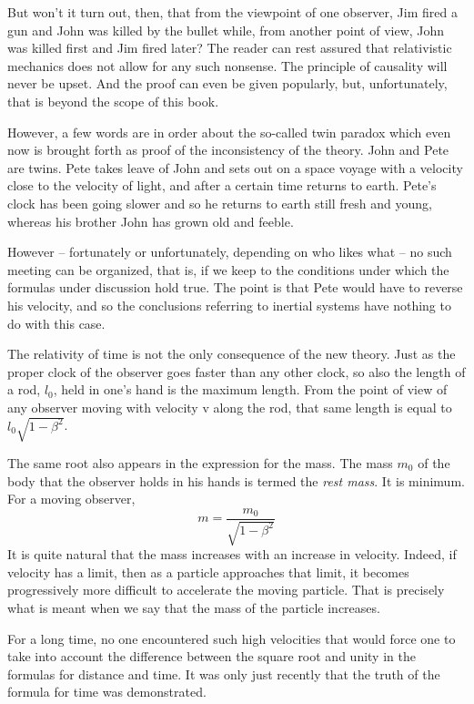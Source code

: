 But won't it turn out, then, that from the viewpoint of one observer, Jim fired a gun and John was killed by the bullet while, from another point of view, John was killed first and Jim fired later? The reader can rest assured that relativistic mechanics does not allow for any such nonsense. The principle of causality will never be upset. And the proof can even be given popularly, but, unfortunately, that is beyond the scope of this book.

However, a few words are in order about the so-called twin paradox which even now is brought forth as proof of the inconsistency of the theory. John and Pete are twins. Pete takes leave of John and sets out on a space voyage with a velocity close to the velocity of light, and after a certain time returns to earth. Pete's clock has been going slower and so he returns to earth still fresh and young, whereas his brother John has grown old and feeble.

However -- fortunately or unfortunately, depending on who likes what -- no such meeting can be organized, that is, if we keep to the conditions under which the formulas under discussion hold true. The point is that Pete would have to reverse his velocity, and so the conclusions re­ferring to inertial systems have nothing to do with this case.

The relativity of time is not the only consequence of the new theory. Just as the proper clock of the observer goes faster than any other clock, so also the length of a rod, $l_{0}$, held in one's hand is the maximum length. From the point of view of any observer moving with velocity v along the rod, that same length is equal to
$l_{0}\sqrt{1 - \beta^{2}}$.

The same root also appears in the expression for the mass. The mass $m_{0}$ of the body that the observer holds in his hands is termed the \emph{rest mass}. It is minimum. For a moving observer,
\begin{equation*}%
m = \frac{m_{0}}{\sqrt{1 - \beta^{2}}}
\end{equation*}
It is quite natural that the mass increases with an increase in velocity. Indeed, if velocity has a limit, then as a particle approaches that limit, it becomes progressively more difficult to accelerate the moving particle. That is precisely what is meant when we say that the mass of the particle increases.

For a long time, no one encountered such high veloci­ties that would force one to take into account the differ­ence between the square root and unity in the formulas for distance and time. It was only just recently that the truth of the formula for time was demonstrated.

